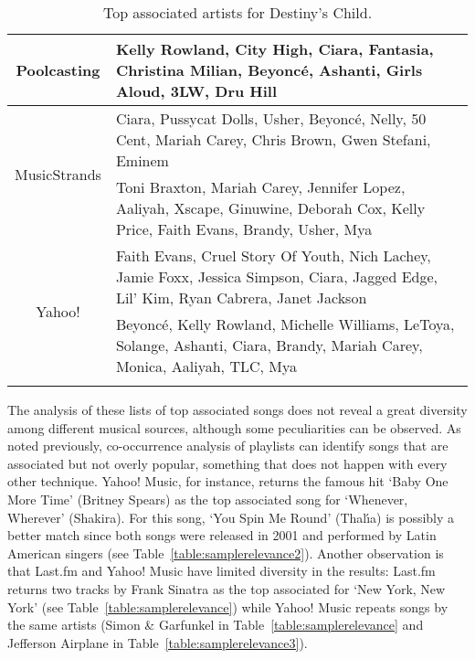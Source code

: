 \begin{table}[bhtp]\centering
\setlength{\extrarowheight}{3pt}
\setlength{\abovecaptionskip}{3pt}
\setlength{\belowcaptionskip}{3pt}
\setlength{\intextsep}{0pt}
\caption{Top associated artists for Destiny's Child.}\label{table:samplerelevance7}
{\fontsize{8}{10}\selectfont
\begin{tabular}{|c|p{}|}
 \hline 
 \multirow{2}{*}{Poolcasting} &
 Kelly Rowland, City High, Ciara, Fantasia, Christina Milian, Beyonc\'{e}, Ashanti, Girls Aloud, 3LW, Dru Hill \vspace{2pt} \\
 \hline
 \multirow{2}{*}{MusicStrands} &
 Ciara, Pussycat Dolls, Usher, Beyonc\'{e}, Nelly, 50 Cent, Mariah Carey, Chris Brown, Gwen Stefani, Eminem \vspace{2pt} \\
 \hline
 \multirow{2}{*}{AllMusic} &
 Toni Braxton, Mariah Carey, Jennifer Lopez, Aaliyah, Xscape, Ginuwine, Deborah Cox, Kelly Price, Faith Evans, Brandy, Usher, Mya \vspace{2pt} \\
 \hline
 \multirow{2}{*}{Yahoo!} &
 Faith Evans, Cruel Story Of Youth, Nich Lachey, Jamie Foxx, Jessica Simpson, Ciara, Jagged Edge, Lil' Kim, Ryan Cabrera, Janet Jackson \vspace{2pt} \\
 \hline
 \multirow{2}{*}{Last.fm} &
 Beyonc\'{e}, Kelly Rowland, Michelle Williams, LeToya, Solange, Ashanti, Ciara, Brandy, Mariah Carey, Monica, Aaliyah, TLC, Mya \vspace{2pt} \\
 \hline
 \noalign{\bigskip}
\end{tabular}}
\end{table}
%

The analysis of these lists of top associated songs does not reveal a great diversity among different musical sources, although some peculiarities can be observed.
As noted previously, co-occurrence analysis of playlists can identify songs that are associated but not overly popular, something that does not happen with every other technique.
Yahoo! Music, for instance, returns the famous hit `Baby One More Time' (Britney Spears) as the top associated song for `Whenever, Wherever' (Shakira). For this song, `You Spin Me Round' (Thal\'{\i}a) is possibly a better match since both songs were released in 2001 and performed by Latin American singers (see Table~\ref{table:samplerelevance2}).
Another observation is that Last.fm and Yahoo! Music have limited diversity in the results: Last.fm returns two tracks by Frank Sinatra as the top associated for `New York, New York' (see Table~\ref{table:samplerelevance}) while Yahoo! Music repeats songs by the same artists  (Simon \& Garfunkel in Table~\ref{table:samplerelevance} and Jefferson Airplane in Table~\ref{table:samplerelevance3}).

